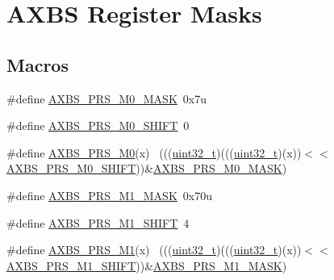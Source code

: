 \hypertarget{group___a_x_b_s___register___masks}{}\section{A\+X\+BS Register Masks}
\label{group___a_x_b_s___register___masks}
\subsection*{Macros}
\begin{DoxyCompactItemize}
\item 
\#define \hyperlink{group___a_x_b_s___register___masks_ga9e794f0ace10f0e077a92ce9f5abbb41}{A\+X\+B\+S\+\_\+\+P\+R\+S\+\_\+\+M0\+\_\+\+M\+A\+SK}~0x7u
\item 
\#define \hyperlink{group___a_x_b_s___register___masks_ga86a8f40f6a5d45cd4868dce4833a17d5}{A\+X\+B\+S\+\_\+\+P\+R\+S\+\_\+\+M0\+\_\+\+S\+H\+I\+FT}~0
\item 
\#define \hyperlink{group___a_x_b_s___register___masks_ga6a2c79e55f5424e6d4e863a6f51c8250}{A\+X\+B\+S\+\_\+\+P\+R\+S\+\_\+\+M0}(x)                                                  ~(((\hyperlink{_p_e___types_8h_a33594304e786b158f3fb30289278f5af}{uint32\+\_\+t})(((\hyperlink{_p_e___types_8h_a33594304e786b158f3fb30289278f5af}{uint32\+\_\+t})(x))$<$$<$\hyperlink{group___a_x_b_s___register___masks_ga86a8f40f6a5d45cd4868dce4833a17d5}{A\+X\+B\+S\+\_\+\+P\+R\+S\+\_\+\+M0\+\_\+\+S\+H\+I\+FT}))\&\hyperlink{group___a_x_b_s___register___masks_ga9e794f0ace10f0e077a92ce9f5abbb41}{A\+X\+B\+S\+\_\+\+P\+R\+S\+\_\+\+M0\+\_\+\+M\+A\+SK})
\item 
\#define \hyperlink{group___a_x_b_s___register___masks_ga69131fbb37b2a3eef0e0f135e265e1c0}{A\+X\+B\+S\+\_\+\+P\+R\+S\+\_\+\+M1\+\_\+\+M\+A\+SK}~0x70u
\item 
\#define \hyperlink{group___a_x_b_s___register___masks_gab293a628aa64a93c04ba49fd27326592}{A\+X\+B\+S\+\_\+\+P\+R\+S\+\_\+\+M1\+\_\+\+S\+H\+I\+FT}~4
\item 
\#define \hyperlink{group___a_x_b_s___register___masks_ga6ae77cbf64e41e6732945b6315dd3a7e}{A\+X\+B\+S\+\_\+\+P\+R\+S\+\_\+\+M1}(x)                                                  ~(((\hyperlink{_p_e___types_8h_a33594304e786b158f3fb30289278f5af}{uint32\+\_\+t})(((\hyperlink{_p_e___types_8h_a33594304e786b158f3fb30289278f5af}{uint32\+\_\+t})(x))$<$$<$\hyperlink{group___a_x_b_s___register___masks_gab293a628aa64a93c04ba49fd27326592}{A\+X\+B\+S\+\_\+\+P\+R\+S\+\_\+\+M1\+\_\+\+S\+H\+I\+FT}))\&\hyperlink{group___a_x_b_s___register___masks_ga69131fbb37b2a3eef0e0f135e265e1c0}{A\+X\+B\+S\+\_\+\+P\+R\+S\+\_\+\+M1\+\_\+\+M\+A\+SK})

\end{DoxyCompactItemize}
